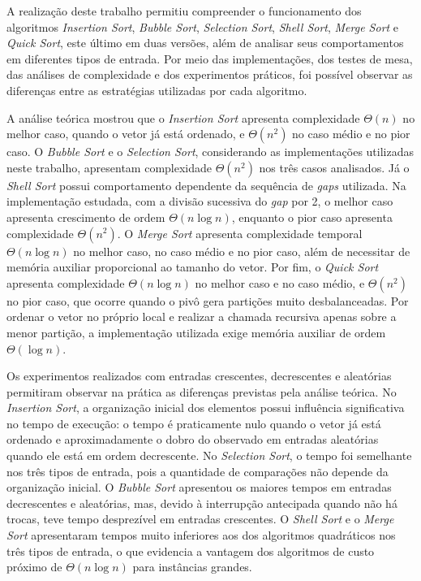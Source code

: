 \quad A realização deste trabalho permitiu compreender o funcionamento dos
algoritmos \textit{Insertion Sort}, \textit{Bubble Sort}, \textit{Selection
Sort}, \textit{Shell Sort}, \textit{Merge Sort} e \textit{Quick Sort}, este
último em duas versões, além de analisar seus comportamentos em diferentes
tipos de entrada. Por meio das implementações, dos testes de mesa, das
análises de complexidade e dos experimentos práticos, foi possível observar
as diferenças entre as estratégias utilizadas por cada algoritmo.

\quad A análise teórica mostrou que o \textit{Insertion Sort} apresenta
complexidade $\Theta(n)$ no melhor caso, quando o vetor já está ordenado, e
$\Theta(n^2)$ no caso médio e no pior caso. O \textit{Bubble Sort} e o
\textit{Selection Sort}, considerando as implementações utilizadas neste
trabalho, apresentam complexidade $\Theta(n^2)$ nos três casos analisados.
Já o \textit{Shell Sort} possui comportamento dependente da sequência de
\textit{gaps} utilizada. Na implementação estudada, com a divisão sucessiva
do \textit{gap} por 2, o melhor caso apresenta crescimento de ordem
$\Theta(n\log n)$, enquanto o pior caso apresenta complexidade
$\Theta(n^2)$. O \textit{Merge Sort} apresenta complexidade temporal
$\Theta(n\log n)$ no melhor caso, no caso médio e no pior caso, além de
necessitar de memória auxiliar proporcional ao tamanho do vetor. Por fim, o
\textit{Quick Sort} apresenta complexidade $\Theta(n\log n)$ no melhor caso
e no caso médio, e $\Theta(n^2)$ no pior caso, que ocorre quando o pivô
gera partições muito desbalanceadas. Por ordenar o vetor no próprio local e
realizar a chamada recursiva apenas sobre a menor partição, a implementação
utilizada exige memória auxiliar de ordem $\Theta(\log n)$.

\quad Os experimentos realizados com entradas crescentes, decrescentes e
aleatórias permitiram observar na prática as diferenças previstas pela
análise teórica. No \textit{Insertion Sort}, a organização inicial dos
elementos possui influência significativa no tempo de execução: o tempo é
praticamente nulo quando o vetor já está ordenado e aproximadamente o dobro
do observado em entradas aleatórias quando ele está em ordem decrescente.
No \textit{Selection Sort}, o tempo foi semelhante nos três tipos de
entrada, pois a quantidade de comparações não depende da organização
inicial. O \textit{Bubble Sort} apresentou os maiores tempos em entradas
decrescentes e aleatórias, mas, devido à interrupção antecipada quando não
há trocas, teve tempo desprezível em entradas crescentes. O \textit{Shell
Sort} e o \textit{Merge Sort} apresentaram tempos muito inferiores aos dos
algoritmos quadráticos nos três tipos de entrada, o que evidencia a
vantagem dos algoritmos de custo próximo de $\Theta(n\log n)$ para
instâncias grandes.

